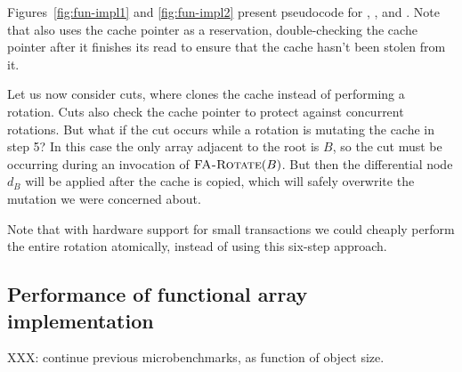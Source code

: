 Figures~\ref{fig:fun-impl1} and \ref{fig:fun-impl2} present pseudocode
for , , and
.  Note that  also uses the
cache pointer as a reservation, double-checking the cache pointer
after it finishes its read to ensure that the cache hasn't been stolen
from it.

Let us now consider cuts, where  clones the cache
instead of performing a rotation.   Cuts also check the cache pointer
to protect against concurrent rotations.  But what if the cut occurs
while a rotation is mutating the cache in step 5?  In this case the
only array adjacent to the root is $B$, so the cut must be occurring
during an invocation of $\text{\sc FA-Rotate}(B)$.  But then the
differential node $d_B$ will be applied after the cache is copied,
which will safely overwrite the mutation we were concerned about.

Note that with hardware support for small transactions \cite{HerlihyMo93}
we could cheaply perform the entire rotation atomically, instead of
using this six-step approach.






\subsection{Performance of functional array implementation}

XXX: continue previous microbenchmarks, as function of object size.


